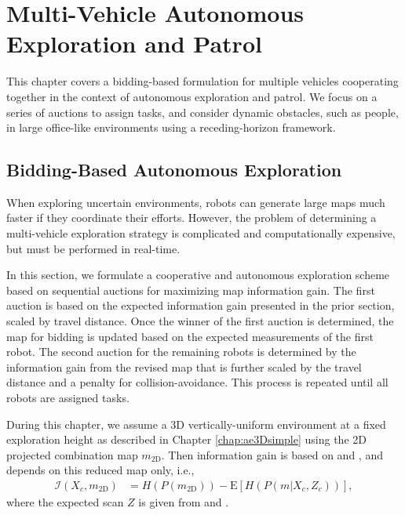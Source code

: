 
\chapter{Multi-Vehicle Autonomous Exploration and Patrol} \label{chap:multivehicle}

This chapter covers a bidding-based formulation for multiple vehicles cooperating together in the context of autonomous exploration and patrol. We focus on a series of auctions to assign tasks, and consider dynamic obstacles, such as people, in large office-like environments using a receding-horizon framework.

\section{Bidding-Based Autonomous Exploration}

When exploring uncertain environments, robots can generate large maps much faster if they coordinate their efforts. However, the problem of determining a multi-vehicle exploration strategy is complicated and computationally expensive, but must be performed in real-time.

In this section, we formulate a cooperative and autonomous exploration scheme based on sequential auctions for maximizing map information gain. The first auction is based on the expected information gain presented in the prior section, scaled by travel distance. Once the winner of the first auction is determined, the map for bidding is updated based on the expected measurements of the first robot. The second auction for the remaining robots is determined by the information gain from the revised map that is further scaled by the travel distance and a penalty for collision-avoidance. This process is repeated until all robots are assigned tasks. 

During this chapter, we assume a 3D vertically-uniform environment at a fixed exploration height as described in Chapter \ref{chap:ae3Dsimple} using the 2D projected combination map $m_\text{2D}$. Then information gain is based on  and , and depends on this reduced map only, i.e.,
\begin{align}
\label{eqn:expectedInfoGainMap2D}
\mathcal I(X_c,m_\text{2D})&=H(P(m_\text{2D}))-\text{E}\left[H(P(m|X_c,Z_c))\right],
\end{align}
where the expected scan $Z$ is given from  and .


